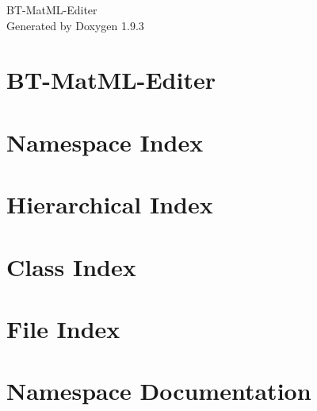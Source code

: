 \documentclass[twoside]{book}
\newcommand{\+}{\discretionary{\mbox{\scriptsize$\hookleftarrow$}}{}{}}
\newcommand{\clearemptydoublepage}{%
    \newpage{\pagestyle{empty}\cleardoublepage}%
  }
\begin{document}
  \raggedbottom
    \hypersetup{pageanchor=false,
                bookmarksnumbered=true,
                pdfencoding=unicode
               }
  \begin{titlepage}
  \vspace*{7cm}
  \begin{center}%
  {\Large BT-\/\+Mat\+ML-\/\+Editer}\\
  \vspace*{1cm}
  {\large Generated by Doxygen 1.9.3}\\
  \end{center}
  \end{titlepage}
  \clearemptydoublepage
  \tableofcontents
  \clearemptydoublepage
  \hypersetup{pageanchor=true}
\chapter{BT-\/\+Mat\+ML-\/\+Editer}
\label{index}\hypertarget{index}{}
\chapter{Namespace Index}

\chapter{Hierarchical Index}

\chapter{Class Index}

\chapter{File Index}

\chapter{Namespace Documentation}

\end{document}
